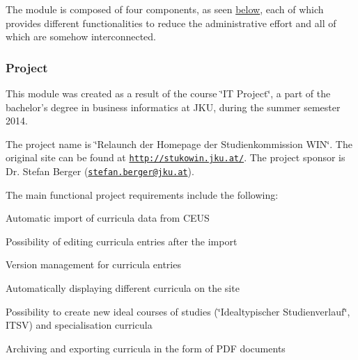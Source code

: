The module is composed of four components, as seen \hyperlink{index_Modules}{below}, each of which provides different functionalities to reduce the administrative effort and all of which are somehow interconnected.\hypertarget{index_Project_Intro}{}\subsubsection{Project}\label{index_Project_Intro}
This module was created as a result of the course \char`\"{}\+I\+T Project\char`\"{}, a part of the bachelor's degree in business informatics at J\+K\+U, during the summer semester 2014.

The project name is \char`\"{}\+Relaunch der Homepage der Studienkommission W\+I\+N\char`\"{}. The original site can be found at \href{http://stukowin.jku.at/}{\tt http\+://stukowin.\+jku.\+at/}. The project sponsor is Dr. Stefan Berger (\href{mailto:stefan.berger@jku.at}{\tt stefan.\+berger@jku.\+at}).

The main functional project requirements include the following\+:
\begin{DoxyEnumerate}
\item Automatic import of curricula data from C\+E\+U\+S
\item Possibility of editing curricula entries after the import
\item Version management for curricula entries
\item Automatically displaying different curricula on the site
\item Possibility to create new ideal courses of studies (\char`\"{}\+Idealtypischer Studienverlauf\char`\"{}, I\+T\+S\+V) and specialisation curricula
\item Archiving and exporting curricula in the form of P\+D\+F documents
\end{DoxyEnumerate}

